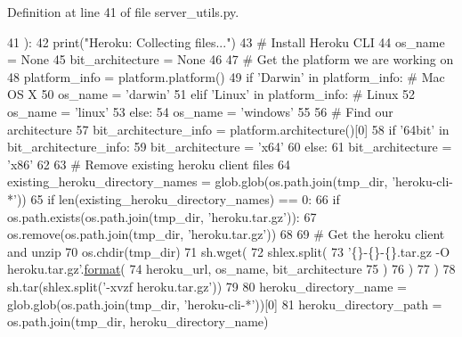 Definition at line 41 of file server\+\_\+utils.\+py.


\begin{DoxyCode}
41 ):
42     print(\textcolor{stringliteral}{"Heroku: Collecting files..."})
43     \textcolor{comment}{# Install Heroku CLI}
44     os\_name = \textcolor{keywordtype}{None}
45     bit\_architecture = \textcolor{keywordtype}{None}
46 
47     \textcolor{comment}{# Get the platform we are working on}
48     platform\_info = platform.platform()
49     \textcolor{keywordflow}{if} \textcolor{stringliteral}{'Darwin'} \textcolor{keywordflow}{in} platform\_info:  \textcolor{comment}{# Mac OS X}
50         os\_name = \textcolor{stringliteral}{'darwin'}
51     \textcolor{keywordflow}{elif} \textcolor{stringliteral}{'Linux'} \textcolor{keywordflow}{in} platform\_info:  \textcolor{comment}{# Linux}
52         os\_name = \textcolor{stringliteral}{'linux'}
53     \textcolor{keywordflow}{else}:
54         os\_name = \textcolor{stringliteral}{'windows'}
55 
56     \textcolor{comment}{# Find our architecture}
57     bit\_architecture\_info = platform.architecture()[0]
58     \textcolor{keywordflow}{if} \textcolor{stringliteral}{'64bit'} \textcolor{keywordflow}{in} bit\_architecture\_info:
59         bit\_architecture = \textcolor{stringliteral}{'x64'}
60     \textcolor{keywordflow}{else}:
61         bit\_architecture = \textcolor{stringliteral}{'x86'}
62 
63     \textcolor{comment}{# Remove existing heroku client files}
64     existing\_heroku\_directory\_names = glob.glob(os.path.join(tmp\_dir, \textcolor{stringliteral}{'heroku-cli-*'}))
65     \textcolor{keywordflow}{if} len(existing\_heroku\_directory\_names) == 0:
66         \textcolor{keywordflow}{if} os.path.exists(os.path.join(tmp\_dir, \textcolor{stringliteral}{'heroku.tar.gz'})):
67             os.remove(os.path.join(tmp\_dir, \textcolor{stringliteral}{'heroku.tar.gz'}))
68 
69         \textcolor{comment}{# Get the heroku client and unzip}
70         os.chdir(tmp\_dir)
71         sh.wget(
72             shlex.split(
73                 \textcolor{stringliteral}{'\{\}-\{\}-\{\}.tar.gz -O heroku.tar.gz'}.\hyperlink{namespaceparlai_1_1chat__service_1_1services_1_1messenger_1_1shared__utils_a32e2e2022b824fbaf80c747160b52a76}{format}(
74                     heroku\_url, os\_name, bit\_architecture
75                 )
76             )
77         )
78         sh.tar(shlex.split(\textcolor{stringliteral}{'-xvzf heroku.tar.gz'}))
79 
80     heroku\_directory\_name = glob.glob(os.path.join(tmp\_dir, \textcolor{stringliteral}{'heroku-cli-*'}))[0]
81     heroku\_directory\_path = os.path.join(tmp\_dir, heroku\_directory\_name)

\end{DoxyCode}
